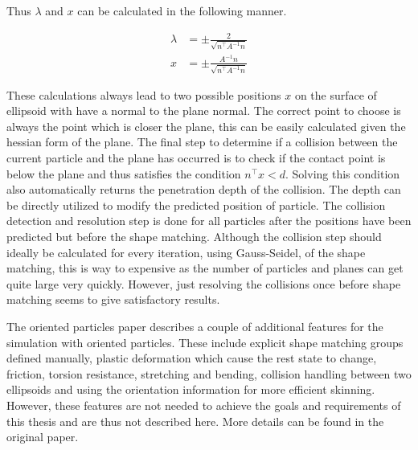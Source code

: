 Thus $\lambda$ and $x$ can be calculated in the following manner.

\begin{align}
\lambda &= \pm \frac{2}{\sqrt{n^\top A^{-1} n}} \\
x &= \pm \frac{A^{-1}n}{\sqrt{n^\top A^{-1} n}}
\end{align}

These calculations always lead to two possible positions $x$ on the surface of ellipsoid with have a normal to the plane normal. The correct point to choose is always the point which is closer the plane, this can be easily calculated given the hessian form of the plane. The final step to determine if a collision between the current particle and the plane has occurred is to check if the contact point is below the plane and thus satisfies the condition $n^\top x < d$. Solving this condition also automatically returns the penetration depth of the collision. The depth can be directly utilized to modify the predicted position of particle. The collision detection and resolution step is done for all particles after the positions have been predicted but before the shape matching. Although the collision step should ideally be calculated for every iteration, using Gauss-Seidel, of the shape matching, this is way to expensive as the number of particles and planes can get quite large very quickly. However, just resolving the collisions once before shape matching seems to give satisfactory results.

The oriented particles paper describes a couple of additional features for the simulation with oriented particles. These include explicit shape matching groups defined manually, plastic deformation which cause the rest state to change, friction, torsion resistance, stretching and bending, collision handling between two ellipsoids and using the orientation information for more efficient skinning. However, these features are not needed to achieve the goals and requirements of this thesis and are thus not described here. More details can be found in the original paper.